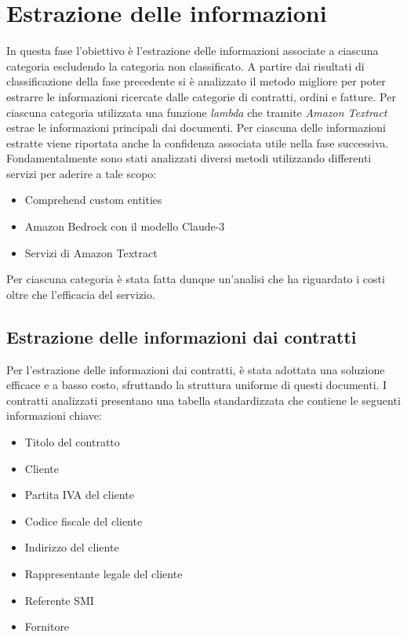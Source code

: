 \section{Estrazione delle informazioni}
\label{sec:estrazione-informazioni}
In questa fase l'obiettivo è l'estrazione delle informazioni associate a ciascuna categoria escludendo la categoria non classificato. A partire dai risultati di classificazione della fase precedente si è analizzato il metodo migliore per poter estrarre le informazioni ricercate dalle categorie di contratti, ordini e fatture. Per ciascuna categoria
utilizzata una funzione \emph{lambda} che tramite \emph{Amazon Textract} estrae le informazioni
principali dai documenti. Per ciascuna delle informazioni estratte viene riportata
anche la confidenza associata utile nella fase successiva.\\
Fondamentalmente sono stati analizzati diversi metodi utilizzando differenti servizi per aderire a tale scopo:
\begin{itemize}
    \item Comprehend custom entities
    \item Amazon Bedrock con il modello Claude-3
    \item Servizi di Amazon Textract
\end{itemize}
Per ciascuna categoria è stata fatta dunque un'analisi che ha riguardato i costi oltre che l'efficacia del servizio.\\
\subsection{Estrazione delle informazioni dai contratti}
\label{subsec:estrazione-contratti}
Per l'estrazione delle informazioni dai contratti, è stata adottata una soluzione efficace e a basso costo, sfruttando la struttura uniforme di questi documenti. I contratti analizzati presentano una tabella standardizzata che contiene le seguenti informazioni chiave:

\begin{itemize}
    \item Titolo del contratto
    \item Cliente
    \item Partita IVA del cliente
    \item Codice fiscale del cliente
    \item Indirizzo del cliente
    \item Rappresentante legale del cliente
    \item Referente SMI
    \item Fornitore
\end{itemize}

